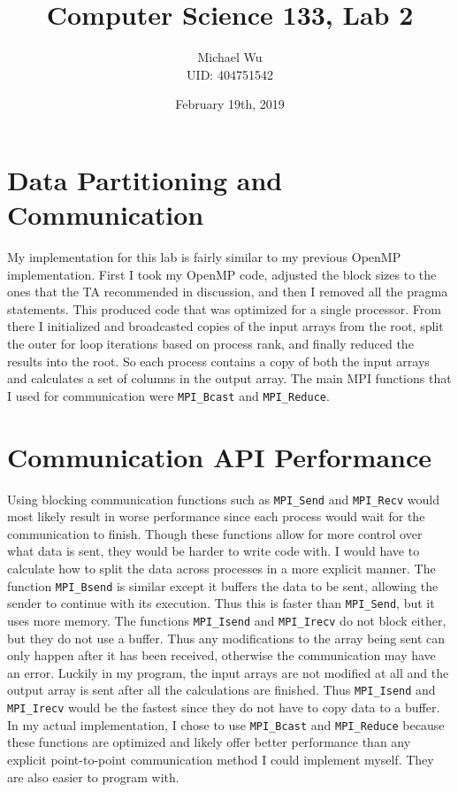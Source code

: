 \documentclass[12pt]{article}
\begin{document}
\title{Computer Science 133, Lab 2}
\date{February 19th, 2019}
\author{Michael Wu\\UID: 404751542}
\maketitle

\section{Data Partitioning and Communication}

My implementation for this lab is fairly similar to my previous OpenMP implementation. First I took my OpenMP code,
adjusted the block sizes to the ones that the TA recommended in discussion, and then I removed all the pragma
statements. This produced code that was optimized for a single processor. From there I initialized
and broadcasted copies of the input arrays from the root, split the outer for loop iterations based on
process rank, and finally reduced the results into the root. So each process contains a copy of
both the input arrays and calculates a set of columns in the output array. The main MPI functions
that I used for communication were \texttt{MPI\_Bcast} and \texttt{MPI\_Reduce}.

\section{Communication API Performance}

Using blocking communication functions such as \texttt{MPI\_Send} and \texttt{MPI\_Recv} would most likely result
in worse performance since each process would wait for the communication to finish. Though these functions
allow for more control over what data is sent, they would be harder to write code with. I would have to calculate
how to split the data across processes in a more explicit manner. The function \texttt{MPI\_Bsend} is similar except it buffers
the data to be sent, allowing the sender to continue with its execution. Thus this is faster than \texttt{MPI\_Send},
but it uses more memory. The functions \texttt{MPI\_Isend} and \texttt{MPI\_Irecv} do not block either, but they do not
use a buffer. Thus any modifications to the array being sent can only happen after it has been received, otherwise
the communication may have an error. Luckily in my program, the input arrays are not modified at all and the output
array is sent after all the calculations are finished. Thus \texttt{MPI\_Isend} and \texttt{MPI\_Irecv} would be
the fastest since they do not have to copy data to a buffer. In my actual implementation, I chose to use \texttt{MPI\_Bcast}
and \texttt{MPI\_Reduce} because these functions are optimized and likely offer better performance than any explicit
point-to-point communication method I could implement myself. They are also easier to program with.
\end{document}
